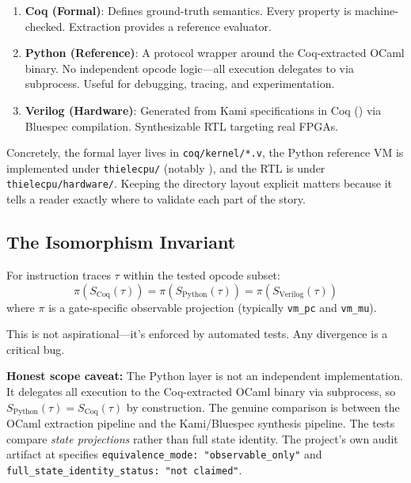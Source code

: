 \begin{enumerate}
    \item \textbf{Coq (Formal)}: Defines ground-truth semantics. Every property is machine-checked. Extraction provides a reference evaluator.
    
    \item \textbf{Python (Reference)}: A protocol wrapper around the Coq-extracted OCaml binary. No independent opcode logic---all execution delegates to  via subprocess. Useful for debugging, tracing, and experimentation.

    \item \textbf{Verilog (Hardware)}: Generated from Kami specifications in Coq () via Bluespec compilation. Synthesizable RTL targeting real FPGAs.
\end{enumerate}
Concretely, the formal layer lives in \texttt{coq/kernel/*.v}, the Python reference VM is implemented under \texttt{thielecpu/} (notably ), and the RTL is under \texttt{thielecpu/hardware/}. Keeping the directory layout explicit matters because it tells a reader exactly where to validate each part of the story.

\subsection{The Isomorphism Invariant}

For instruction traces $\tau$ within the tested opcode subset:
\[
\pi(S_{\text{Coq}}(\tau)) = \pi(S_{\text{Python}}(\tau)) = \pi(S_{\text{Verilog}}(\tau))
\]
where $\pi$ is a gate-specific observable projection (typically \texttt{vm\_pc} and \texttt{vm\_mu}).

This is not aspirational---it's enforced by automated tests. Any divergence is a critical bug.

\textbf{Honest scope caveat:} The Python layer is not an independent implementation. It delegates all execution to the Coq-extracted OCaml binary via subprocess, so $S_{\text{Python}}(\tau) = S_{\text{Coq}}(\tau)$ by construction. The genuine comparison is between the OCaml extraction pipeline and the Kami/Bluespec synthesis pipeline. The tests compare \textit{state projections} rather than full state identity. The project's own audit artifact at  specifies \texttt{equivalence\_mode: "observable\_only"} and \texttt{full\_state\_identity\_status: "not claimed"}.

